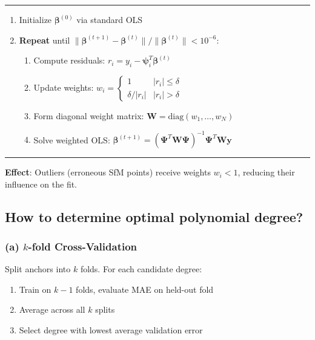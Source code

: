 \documentclass[11pt,a4paper]{article}
\begin{document}
\begin{algorithm}[h]
\caption{IRLS with Huber M-estimator}
\hrule\vspace{0.5em}
\begin{enumerate}[noitemsep,leftmargin=*]
    \item Initialize $\boldsymbol{\beta}^{(0)}$ via standard OLS
    \item \textbf{Repeat} until $\|\boldsymbol{\beta}^{(t+1)} - \boldsymbol{\beta}^{(t)}\|/\|\boldsymbol{\beta}^{(t)}\| < 10^{-6}$:
    \begin{enumerate}[noitemsep]
        \item Compute residuals: $r_i = y_i - \boldsymbol{\psi}_i^T \boldsymbol{\beta}^{(t)}$
        \item Update weights: $w_i = \begin{cases} 1 & |r_i| \leq \delta \\ \delta/|r_i| & |r_i| > \delta \end{cases}$
        \item Form diagonal weight matrix: $\mathbf{W} = \text{diag}(w_1, \ldots, w_N)$
        \item Solve weighted OLS: $\boldsymbol{\beta}^{(t+1)} = (\boldsymbol{\Psi}^T \mathbf{W} \boldsymbol{\Psi})^{-1} \boldsymbol{\Psi}^T \mathbf{W} \mathbf{y}$
    \end{enumerate}
\end{enumerate}
\vspace{0.3em}\hrule
\end{algorithm}

\textbf{Effect}: Outliers (erroneous SfM points) receive weights $w_i < 1$, reducing their influence on the fit.

\subsection{How to determine optimal polynomial degree?}

\subsubsection{(a) $k$-fold Cross-Validation}

Split anchors into $k$ folds. For each candidate degree:
\begin{enumerate}[noitemsep]
    \item Train on $k-1$ folds, evaluate MAE on held-out fold
    \item Average across all $k$ splits
    \item Select degree with lowest average validation error
\end{enumerate}
\end{document}

